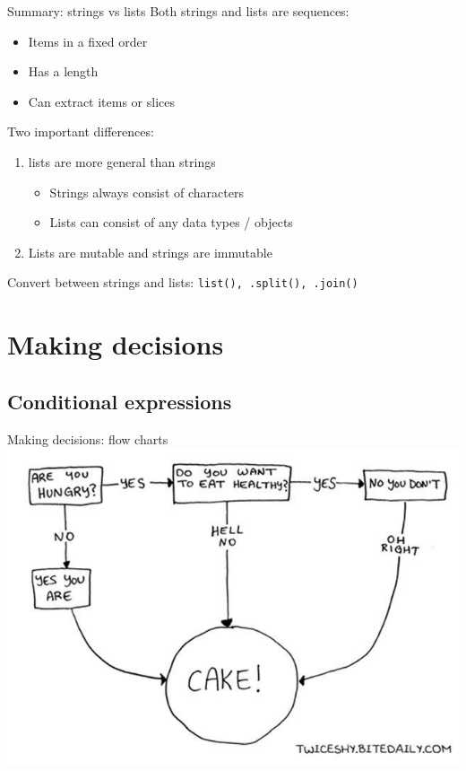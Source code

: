 \documentclass[aspectratio=169,usenames,dvipsnames]{beamer}
\begin{document}
\begin{frame}[fragile]{Summary: strings vs lists}
Both strings and lists are sequences:
    \begin{itemize}
        \item Items in a fixed order
        \item Has a length
        \item Can extract items or slices
    \end{itemize}

Two important differences:
\begin{enumerate}
    \item lists are more general than strings
        \begin{itemize}
            \item Strings always consist of characters
            \item Lists can consist of any data types / objects
        \end{itemize}
    \item Lists are mutable and strings are immutable
\end{enumerate}

    Convert between strings and lists:
        \texttt{list(), .split(), .join()}
\end{frame}







\section{Making decisions}
\subsection{Conditional expressions}
\frame{\tableofcontents[currentsection]}

\begin{frame}{Making decisions: flow charts}
    \includegraphics[height=0.8\textheight]{fig/flowchart}
\end{frame}
\end{document}
